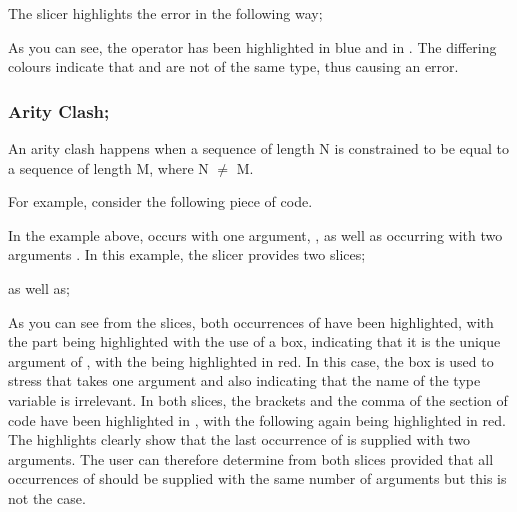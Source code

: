 \documentclass{report}
\begin{document}
\begin{itemize}
The slicer highlights the error in the following way;


As you can see, the \incodebody{+} operator has been highlighted in blue and
 in \tesEndPointOne. The differing colours indicate that
 and \incodebody{+} are not of the same type,
thus causing an error.

\newpage


\subsubsection{Arity Clash;}

  \subitem An arity clash happens when a sequence of length N is
  constrained to be equal to a sequence of length M, where N $\neq$ M.


For example, consider the following piece of code.


In the example above,  occurs with one argument,
, as well as occurring with two arguments
. In this example, the slicer provides two
slices;


as well as;


As you can see from the slices, both occurrences of  have been highlighted, with the  part being
highlighted with the use of a box, indicating that it is the unique
argument of , with the  being
highlighted in red. In this case, the box is used to stress that
 takes one argument and also indicating that the name
of the type variable  is irrelevant. In both slices,
the brackets and the comma of the section of code  have been highlighted in \tesEndPointOne, with the following
 again being highlighted in red. The \tesEndPointOne highlights
clearly show that the last occurrence of  is supplied
with two arguments. The user can therefore determine from both slices
provided that all occurrences of  should be supplied
with the same number of arguments but this is not the case.


\end{itemize}
\end{document}
